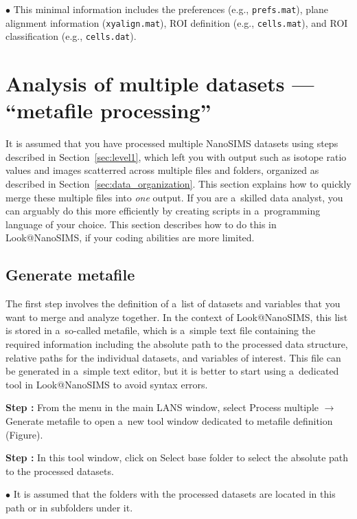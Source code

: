 \documentclass[a4paper, 11pt]{article}
\newcommand{\ttt}[1]{\texttt{#1}}
\newcommand{\lans}[1]{{\color{magenta}#1}}
\newcommand\ra{\rightarrow}
\newcounter{step}
\newcommand\s{\addtocounter{step}{1}\noindent\textbf{Step \thestep:}{ }}
\newcommand\bul{\noindent$\bullet${ }}
\begin{document}
\bul This minimal information includes the preferences (e.g., \ttt{prefs.mat}), plane alignment information (\ttt{xyalign.mat}), ROI definition (e.g., \ttt{cells.mat}), and ROI classification (e.g., \ttt{cells.dat}).


\section{Analysis of multiple datasets --- ``metafile processing''}
\label{sec:level2}

It is assumed that you have processed multiple NanoSIMS datasets using steps described in Section~\ref{sec:level1}, which left you with output such as isotope ratio values and images scatterred across multiple files and folders, organized as described in Section~\ref{sec:data_organization}. This section explains how to quickly merge these multiple files into \emph{one} output. If you are a~skilled data analyst, you can arguably do this more efficiently by creating scripts in a~programming language of your choice. This section describes how to do this in Look@NanoSIMS, if your coding abilities are more limited.


\subsection{Generate metafile}
\setcounter{step}{0}

The first step involves the definition of a~list of datasets and variables that you want to merge and analyze together. In the context of Look@NanoSIMS, this list is stored in a~so-called metafile, which is a~simple text file containing the required information including the absolute path to the processed data structure, relative paths for the individual datasets, and variables of interest. This file can be generated in a~simple text editor, but it is better to start using a~dedicated tool in Look@NanoSIMS to avoid syntax errors.

\s From the menu in the main LANS window, select \lans{Process multiple} $\ra$ \lans{Generate metafile} to open a~new tool window dedicated to metafile definition (Figure). 

\s In this tool window, click on \lans{Select base folder} to select the absolute path to the processed datasets.

\bul It is assumed that the folders with the processed datasets are located in this path or in subfolders under it.
\end{document}
